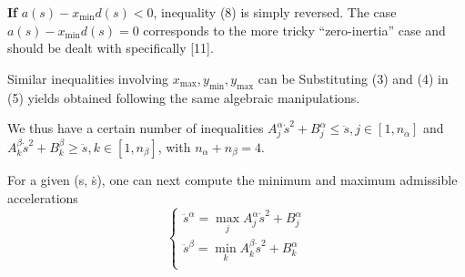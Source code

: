 \documentclass[journal]{IEEEtran}
\begin{document}
\textbf{If} $a(s) − x_{\min}d(s) < 0$, inequality (8) is simply reversed. The case $a(s)−x_{\min}d(s) = 0$ corresponds to the more tricky “zero-inertia” case and should be dealt with specifically [11].

Similar inequalities involving $x_{\max}, y_{\min}, y_{\max}$ can be Substituting (3) and (4) in (5) yields
obtained following the same algebraic manipulations.

We thus have a certain number of inequalities $A^{\alpha}_{j}\dot{s}^{2}+B^{\alpha}_{j} \leq \ddot{s},j\in[1,n_{\alpha}]$ and $A^{\beta}_{k}\dot{s}^{2}+B^{\beta}_{k}\geq \ddot{s},k\in[1,n_{\beta}]$, with $n_{\alpha}+n_{\beta}=4$.

For a given (s, ṡ), one can next compute the minimum and maximum admissible accelerations
\begin{equation}
  \left\{
   \begin{array}{c}
   \ddot{s}^{\alpha}=\max_{j}A _{j}^{\alpha}\dot{s}^{2}+B^{\alpha}_{j} \\
   \ddot{s}^{\beta}=\min_{k}A _{k}^{\beta}\dot{s}^{2}+B^{\alpha}_{k}  \\
   \end{array}
  \right.
\end{equation}
\end{document}
